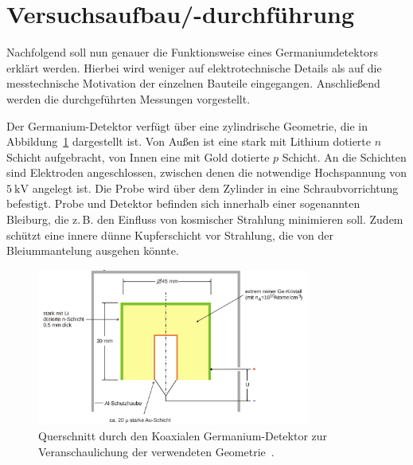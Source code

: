 \section{Versuchsaufbau/-durchführung}
Nachfolgend soll nun genauer die Funktionsweise eines Germaniumdetektors erklärt werden. 
Hierbei wird weniger auf elektrotechnische Details 
als auf die messtechnische Motivation der einzelnen Bauteile eingegangen.
Anschließend werden die durchgeführten Messungen vorgestellt.

Der Germanium-Detektor verfügt über eine zylindrische Geometrie, die in Abbildung~\ref{fig: geometrie} dargestellt ist. 
Von Außen ist eine stark mit Lithium dotierte $n$
Schicht aufgebracht, von Innen eine mit Gold dotierte $p$ Schicht. An die Schichten sind Elektroden angeschlossen, zwischen denen 
die notwendige Hochspannung von $\SI{5}{\kilo\volt}$ angelegt ist. Die Probe wird über dem Zylinder in eine Schraubvorrichtung 
befestigt. Probe und Detektor befinden sich innerhalb einer sogenannten Bleiburg, die z.\,B. den Einfluss von kosmischer 
Strahlung minimieren soll. Zudem schützt eine innere dünne Kupferschicht vor Strahlung, die von der Bleiummantelung ausgehen 
könnte. 
\begin{figure}
\centering
\includegraphics[width = 0.8\textwidth]{pics/geometrie.png}
\caption{Querschnitt durch den Koaxialen Germanium-Detektor zur Veranschaulichung der verwendeten Geometrie~\cite{anleitungv18}.}
\label{fig: geometrie}
\end{figure}

